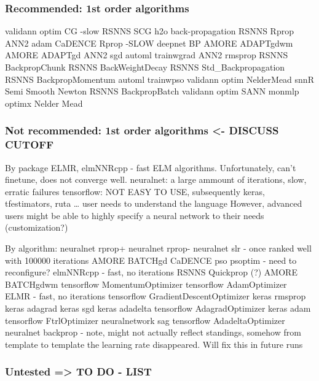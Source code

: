 \hypertarget{recommended-1st-order-algorithms}{%
\subsubsection{Recommended: 1st order
algorithms}\label{recommended-1st-order-algorithms}}

validann optim CG -slow RSNNS SCG h2o back-propagation RSNNS Rprop ANN2
adam CaDENCE Rprop -SLOW deepnet BP AMORE ADAPTgdwm AMORE ADAPTgd ANN2
sgd automl trainwgrad ANN2 rmsprop RSNNS BackpropChunk RSNNS
BackWeightDecay RSNNS Std\_Backpropagation RSNNS BackpropMomentum automl
trainwpso validann optim NelderMead snnR Semi Smooth Newton RSNNS
BackpropBatch validann optim SANN monmlp optimx Nelder Mead

\hypertarget{not-recommended-1st-order-algorithms---discuss-cutoff}{%
\subsubsection{Not recommended: 1st order algorithms \textless- DISCUSS
CUTOFF}\label{not-recommended-1st-order-algorithms---discuss-cutoff}}

By package ELMR, elmNNRcpp - fast ELM algorithms. Unfortunately, can't
finetune, does not converge well. neuralnet: a large ammount of
iterations, slow, erratic failures tensorflow: NOT EASY TO USE,
subsequently keras, tfestimators, ruta \ldots{} user needs to understand
the language However, advanced users might be able to highly specify a
neural network to their needs (customization?)

By algorithm: neuralnet rprop+ neuralnet rprop- neuralnet slr - once
ranked well with 100000 iterations AMORE BATCHgd CaDENCE pso psoptim -
need to reconfigure? elmNNRcpp - fast, no iterations RSNNS Quickprop (?)
AMORE BATCHgdwm tensorflow MomentumOptimizer tensorflow AdamOptimizer
ELMR - fast, no iterations tensorflow GradientDescentOptimizer keras
rmsprop keras adagrad keras sgd keras adadelta tensorflow
AdagradOptimizer keras adam tensorflow FtrlOptimizer neuralnetwork sag
tensorflow AdadeltaOptimizer neuralnet backprop - note, might not
actually reflect standings, somehow from template to template the
learning rate disappeared. Will fix this in future runs

\hypertarget{untested-to-do---list}{%
\subsubsection{Untested =\textgreater{} TO DO -
LIST}\label{untested-to-do---list}}

